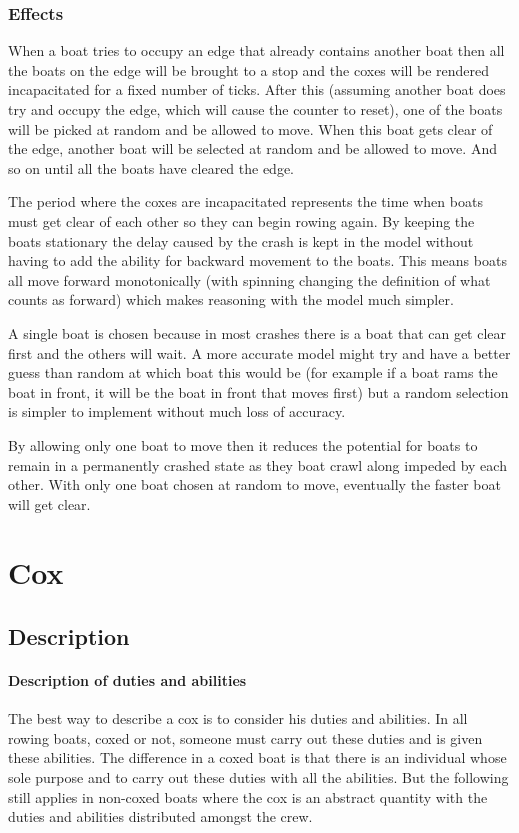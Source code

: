       \subsubsection{Effects}
      When a boat tries to occupy an edge that already contains another boat then all the boats on the edge will be brought to a stop and the coxes will be rendered incapacitated for a fixed number of ticks. After this (assuming another boat does try and occupy the edge, which will cause the counter to reset), one of the boats will be picked at random and be allowed to move. When this boat gets clear of the edge, another boat will be selected at random and be allowed to move. And so on until all the boats have cleared the edge.
      
      The period where the coxes are incapacitated represents the time when boats must get clear of each other so they can begin rowing again. By keeping the boats stationary the delay caused by the crash is kept in the model without having to add the ability for backward movement to the boats. This means boats all move forward monotonically (with spinning changing the definition of what counts as forward) which makes reasoning with the model much simpler.
      
      A single boat is chosen because in most crashes there is a boat that can get clear first and the others will wait. A more accurate model might try and have a better guess than random at which boat this would be (for example if a boat rams the boat in front, it will be the boat in front that moves first) but a random selection is simpler to implement without much loss of accuracy.
      
      By allowing only one boat to move then it reduces the potential for boats to remain in a permanently crashed state as they boat crawl along impeded by each other. With only one boat chosen at random to move, eventually the faster boat will get clear.
      
    \section{Cox}
      \subsection{Description}
      \paragraph{Description of duties and abilities}
      The best way to describe a cox is to consider his duties and abilities. In all rowing boats, coxed or not, someone must carry out these duties and is given these abilities. The difference in a coxed boat is that there is an individual whose sole purpose and to carry out these duties with all the abilities. But the following still applies in non-coxed boats where the cox is an abstract quantity with the duties and abilities distributed amongst the crew.
      
